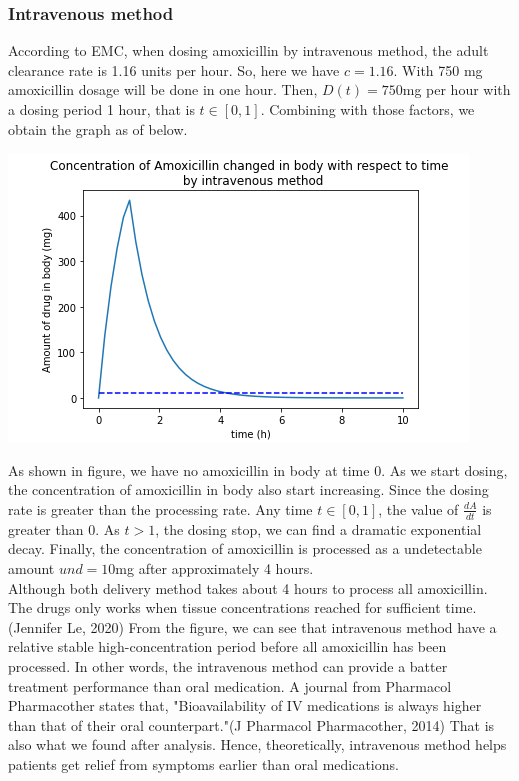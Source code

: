 \documentclass{article}
\begin{document}
\subsubsection*{Intravenous method}
According to EMC, when dosing amoxicillin by intravenous method, the adult clearance rate is 1.16 units per hour. So, here we have $c = 1.16$. With 750 mg amoxicillin dosage will be done in one hour. Then, $D(t) = 750$mg per hour with a dosing period 1 hour, that is $t\in [0,1]$. Combining with those factors, we obtain the graph as of below.\\

\begin{center}
    \includegraphics[scale = 0.7]{simuIntra.png}
\end{center}
As shown in figure, we have no amoxicillin in body at time 0. As we start dosing, the concentration of amoxicillin in body also start increasing. Since the dosing rate is greater than the processing rate. Any time $t\in [0,1]$, the value of $\frac{dA}{dt}$ is greater than 0. As $t > 1$, the dosing stop, we can find a dramatic exponential decay. Finally, the concentration of amoxicillin is processed as a undetectable amount $und = 10$mg after approximately 4 hours. \\

Although both delivery method takes about 4 hours to process all amoxicillin. The drugs only works when tissue concentrations reached for sufficient time.(Jennifer Le, 2020) From the figure, we can see that intravenous method have a relative stable high-concentration period before all amoxicillin has been processed. In other words, the intravenous method can provide a batter treatment performance than oral medication. A journal from Pharmacol Pharmacother states that, "Bioavailability of IV medications is always higher than that of their oral counterpart."(J Pharmacol Pharmacother, 2014) That is also what we found after analysis. Hence, theoretically, intravenous method helps patients get relief from symptoms earlier than oral medications. \\
\end{document}
